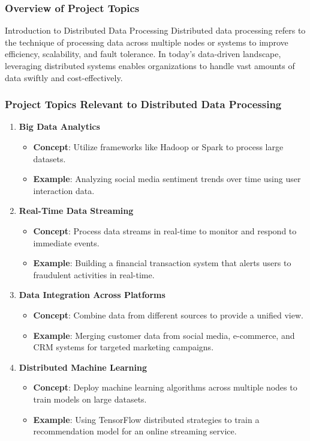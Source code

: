 \documentclass[aspectratio=169]{beamer}
\begin{document}
\begin{frame}
    \frametitle{Overview of Project Topics}
    \begin{block}{Introduction to Distributed Data Processing}
        Distributed data processing refers to the technique of processing data across multiple nodes or systems to improve efficiency, scalability, and fault tolerance. In today's data-driven landscape, leveraging distributed systems enables organizations to handle vast amounts of data swiftly and cost-effectively.
    \end{block}
\end{frame}

\begin{frame}
    \frametitle{Project Topics Relevant to Distributed Data Processing}
    \begin{enumerate}
        \item \textbf{Big Data Analytics}
            \begin{itemize}
                \item \textbf{Concept}: Utilize frameworks like Hadoop or Spark to process large datasets.
                \item \textbf{Example}: Analyzing social media sentiment trends over time using user interaction data.
            \end{itemize}
        \item \textbf{Real-Time Data Streaming}
            \begin{itemize}
                \item \textbf{Concept}: Process data streams in real-time to monitor and respond to immediate events.
                \item \textbf{Example}: Building a financial transaction system that alerts users to fraudulent activities in real-time.
            \end{itemize}
        \item \textbf{Data Integration Across Platforms}
            \begin{itemize}
                \item \textbf{Concept}: Combine data from different sources to provide a unified view.
                \item \textbf{Example}: Merging customer data from social media, e-commerce, and CRM systems for targeted marketing campaigns.
            \end{itemize}
        \item \textbf{Distributed Machine Learning}
            \begin{itemize}
                \item \textbf{Concept}: Deploy machine learning algorithms across multiple nodes to train models on large datasets.
                \item \textbf{Example}: Using TensorFlow distributed strategies to train a recommendation model for an online streaming service.
            \end{itemize}
    \end{enumerate}
\end{frame}
\end{document}
